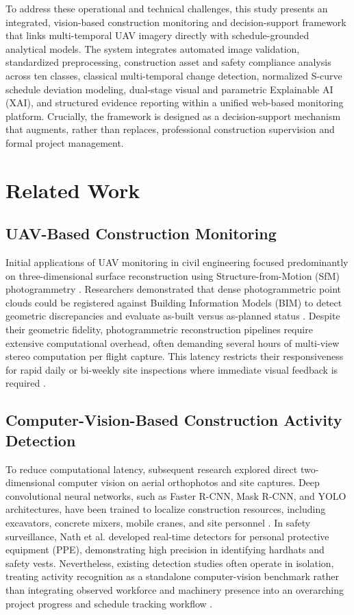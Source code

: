 \documentclass[conference]{IEEEtran}
\begin{document}
To address these operational and technical challenges, this study presents an integrated, vision-based construction monitoring and decision-support framework that links multi-temporal UAV imagery directly with schedule-grounded analytical models. The system integrates automated image validation, standardized preprocessing, construction asset and safety compliance analysis across ten classes, classical multi-temporal change detection, normalized S-curve schedule deviation modeling, dual-stage visual and parametric Explainable AI (XAI), and structured evidence reporting within a unified web-based monitoring platform. Crucially, the framework is designed as a decision-support mechanism that augments, rather than replaces, professional construction supervision and formal project management.

\section{Related Work}

\subsection{UAV-Based Construction Monitoring}
Initial applications of UAV monitoring in civil engineering focused predominantly on three-dimensional surface reconstruction using Structure-from-Motion (SfM) photogrammetry \cite{siebert2014mobile, westoby2012structure}. Researchers demonstrated that dense photogrammetric point clouds could be registered against Building Information Models (BIM) to detect geometric discrepancies and evaluate as-built versus as-planned status \cite{golparvar2015automated, nex2014uav}. Despite their geometric fidelity, photogrammetric reconstruction pipelines require extensive computational overhead, often demanding several hours of multi-view stereo computation per flight capture. This latency restricts their responsiveness for rapid daily or bi-weekly site inspections where immediate visual feedback is required \cite{reja2022computer}.

\subsection{Computer-Vision-Based Construction Activity Detection}
To reduce computational latency, subsequent research explored direct two-dimensional computer vision on aerial orthophotos and site captures. Deep convolutional neural networks, such as Faster R-CNN, Mask R-CNN, and YOLO architectures, have been trained to localize construction resources, including excavators, concrete mixers, mobile cranes, and site personnel \cite{fang2018detecting, ding2018deep}. In safety surveillance, Nath et al. \cite{nath2020deep} developed real-time detectors for personal protective equipment (PPE), demonstrating high precision in identifying hardhats and safety vests. Nevertheless, existing detection studies often operate in isolation, treating activity recognition as a standalone computer-vision benchmark rather than integrating observed workforce and machinery presence into an overarching project progress and schedule tracking workflow \cite{reja2022computer, teizer2015status}.
\end{document}
